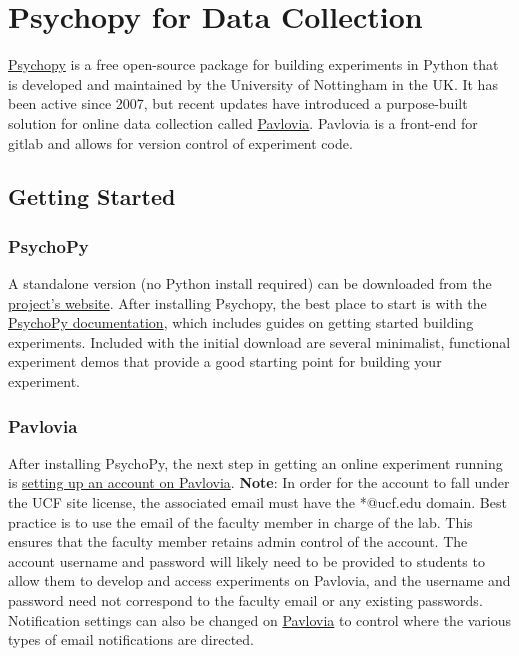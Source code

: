 \documentclass[
]{book}
\begin{document}
\hypertarget{psychopy}{%
\chapter{Psychopy for Data Collection}\label{psychopy}}

\href{https://www.psychopy.org}{Psychopy} is a free open-source package for building experiments in Python that is developed and maintained by the University of Nottingham in the UK. It has been active since 2007, but recent updates have introduced a purpose-built solution for online data collection called \href{https://pavlovia.org/\#about}{Pavlovia}. Pavlovia is a front-end for gitlab and allows for version control of experiment code.

\hypertarget{getting-started}{%
\section{Getting Started}\label{getting-started}}

\hypertarget{psychopy-1}{%
\subsection{PsychoPy}\label{psychopy-1}}

A standalone version (no Python install required) can be downloaded from the \href{https://www.psychopy.org/download.html}{project's website}. After installing Psychopy, the best place to start is with the \href{https://www.psychopy.org/documentation.html}{PsychoPy documentation}, which includes guides on getting started building experiments. Included with the initial download are several minimalist, functional experiment demos that provide a good starting point for building your experiment.

\hypertarget{pavlovia}{%
\subsection{Pavlovia}\label{pavlovia}}

After installing PsychoPy, the next step in getting an online experiment running is \href{https://gitlab.pavlovia.org/users/sign_in}{setting up an account on Pavlovia}. \textbf{Note}: In order for the account to fall under the UCF site license,
the associated email must have the *@ucf.edu domain. Best practice is to use the email of the faculty member in charge of the lab. This ensures that the faculty member retains admin control of the account. The account username and password will likely need to be provided to students to allow them to develop and access experiments on Pavlovia, and the username and password need not correspond to the faculty email or any existing passwords. Notification settings can also be changed on \href{https://gitlab.pavlovia.org/profile/emails}{Pavlovia} to control where the various types of email notifications are directed.
\end{document}
